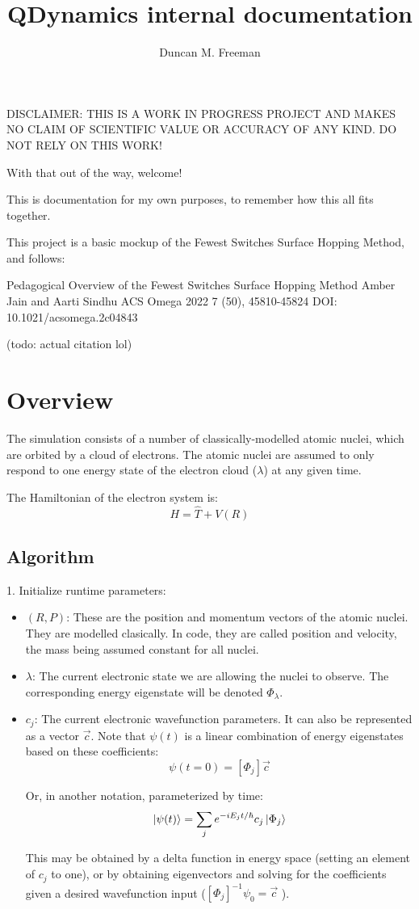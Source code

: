 \documentclass[12pt]{article}
\title{QDynamics internal documentation}
\author{Duncan M. Freeman}
\newcommand{\eigbasis}[0]{[\Phi_j]}
\begin{document}
\maketitle
DISCLAIMER: THIS IS A WORK IN PROGRESS PROJECT AND MAKES NO CLAIM OF SCIENTIFIC VALUE OR ACCURACY OF ANY KIND. DO NOT RELY ON THIS WORK!

With that out of the way, welcome!

This is documentation for my own purposes, to remember how this all fits together.

This project is a basic mockup of the Fewest Switches Surface Hopping
Method, and follows:

Pedagogical Overview of the Fewest Switches Surface Hopping Method
Amber Jain and Aarti Sindhu
ACS Omega 2022 7 (50), 45810-45824
DOI: 10.1021/acsomega.2c04843

(todo: actual citation lol)
\clearpage

\section{Overview}
The simulation consists of a number of classically-modelled atomic nuclei, which are orbited by a cloud of electrons. The atomic nuclei are assumed to only respond to one energy state of the electron cloud ($\lambda$) at any given time. 

The Hamiltonian of the electron system is:
\[ H = \hat{T} + V(R) \]

\subsection{Algorithm}

1. Initialize runtime parameters:
\begin{itemize}
    \item $(R, P)$: These are the position and momentum vectors of the atomic nuclei. They are modelled clasically. In code, they are called position and velocity, the mass being assumed constant for all nuclei.
    \item $\lambda$: The current electronic state we are allowing the nuclei to observe. The corresponding energy eigenstate will be denoted $\Phi_\lambda$.
    \item $c_j$: The current electronic wavefunction parameters. It can also be represented as a vector $\vec{c}$. Note that $\psi(t)$ is a linear combination of energy eigenstates based on these coefficients: 
        \[ \psi(t=0) = \eigbasis \vec{c} \]

        Or, in another notation, parameterized by time:
        \[ \ket{\psi(t)} = \sum_j e^{-iE_jt/\hbar} c_j \ket{\Phi_j} \]

        This may be obtained by a delta function in energy space (setting an element of $c_j$ to one), or by obtaining eigenvectors and solving for the coefficients given a desired wavefunction input ($\eigbasis^{-1} \psi_0 = \vec{c}$ ).
\end{itemize}
\end{document}
